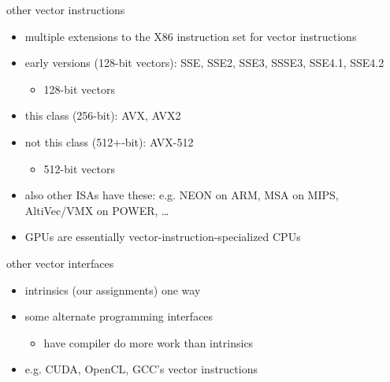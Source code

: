 \begin{frame}{other vector instructions}
    \begin{itemize}
    \item multiple extensions to the X86 instruction set for vector instructions
    \item early versions (128-bit vectors): SSE, SSE2, SSE3, SSSE3, SSE4.1, SSE4.2
        \begin{itemize}
        \item 128-bit vectors
        \end{itemize}
    \item this class (256-bit): AVX, AVX2
    \item not this class (512+-bit): AVX-512
        \begin{itemize}
        \item 512-bit vectors
        \end{itemize}
    \item also other ISAs have these: e.g. NEON on ARM, MSA on MIPS, AltiVec/VMX on POWER, \ldots
    \item GPUs are essentially vector-instruction-specialized CPUs
    \end{itemize}
\end{frame}

\begin{frame}{other vector interfaces}
    \begin{itemize}
    \item intrinsics (our assignments) one way
    \item some alternate programming interfaces
        \begin{itemize}
        \item have compiler do more work than intrinsics
        \end{itemize}
    \item e.g. CUDA, OpenCL, GCC's vector instructions
    \end{itemize}
\end{frame}
